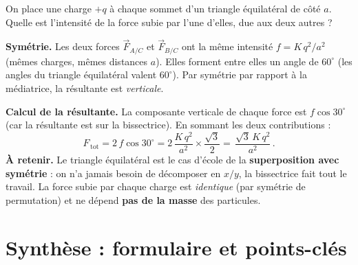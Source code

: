 \documentclass[11pt,a4paper]{article}
\newcommand{\vc}[1]{\vec{#1}}
\newcommand{\F}[2]{\vc{F}_{#1/#2}}     %
\begin{document}
\begin{exemple}
On place une charge $+q$ à chaque sommet d'un triangle équilatéral de côté $a$. Quelle est
l'intensité de la force subie par l'une d'elles, due aux deux autres ?

\smallskip
\begin{center}
\end{center}

\textbf{Symétrie.} Les deux forces $\F{A}{C}$ et $\F{B}{C}$ ont la même intensité
$f = K\,q^2/a^{2}$ (mêmes charges, mêmes distances $a$). Elles forment entre elles un angle de
$60^\circ$ (les angles du triangle équilatéral valent $60^\circ$). Par symétrie par rapport à la
médiatrice, la résultante est \emph{verticale}.

\textbf{Calcul de la résultante.} La composante verticale de chaque force est $f\cos 30^\circ$ (car
la résultante est sur la bissectrice). En sommant les deux contributions :
\[ F_{\,\text{tot}} = 2\,f\cos 30^\circ = 2\,\frac{K\,q^2}{a^{2}}\times\frac{\sqrt{3}}{2}
   = \boxed{\,\dfrac{\sqrt{3}\,K\,q^{2}}{a^{2}}\,}. \]
\textbf{À retenir.} Le triangle équilatéral est le cas d'école de la \textbf{superposition avec
symétrie} : on n'a jamais besoin de décomposer en $x/y$, la bissectrice fait tout le travail. La
force subie par chaque charge est \emph{identique} (par symétrie de permutation) et ne dépend
\textbf{pas de la masse} des particules.
\end{exemple}

\section{Synthèse : formulaire et points-clés}
\end{document}
